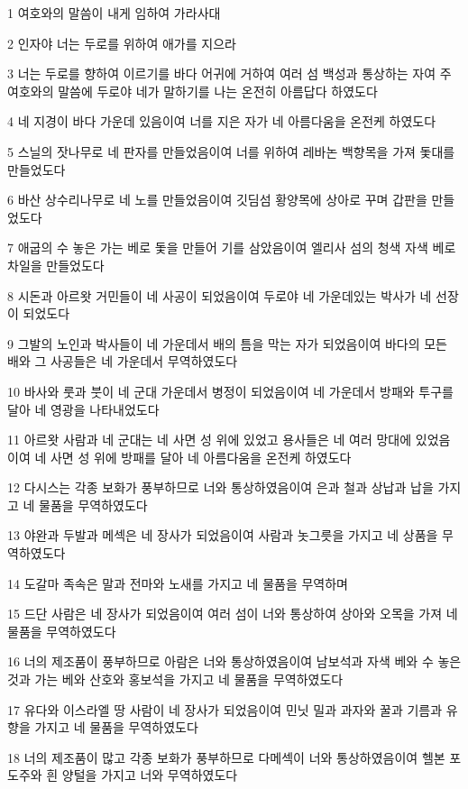 \par 1 여호와의 말씀이 내게 임하여 가라사대
\par 2 인자야 너는 두로를 위하여 애가를 지으라
\par 3 너는 두로를 향하여 이르기를 바다 어귀에 거하여 여러 섬 백성과 통상하는 자여 주 여호와의 말씀에 두로야 네가 말하기를 나는 온전히 아름답다 하였도다
\par 4 네 지경이 바다 가운데 있음이여 너를 지은 자가 네 아름다움을 온전케 하였도다
\par 5 스닐의 잣나무로 네 판자를 만들었음이여 너를 위하여 레바논 백향목을 가져 돛대를 만들었도다
\par 6 바산 상수리나무로 네 노를 만들었음이여 깃딤섬 황양목에 상아로 꾸며 갑판을 만들었도다
\par 7 애굽의 수 놓은 가는 베로 돛을 만들어 기를 삼았음이여 엘리사 섬의 청색 자색 베로 차일을 만들었도다
\par 8 시돈과 아르왓 거민들이 네 사공이 되었음이여 두로야 네 가운데있는 박사가 네 선장이 되었도다
\par 9 그발의 노인과 박사들이 네 가운데서 배의 틈을 막는 자가 되었음이여 바다의 모든 배와 그 사공들은 네 가운데서 무역하였도다
\par 10 바사와 룻과 붓이 네 군대 가운데서 병정이 되었음이여 네 가운데서 방패와 투구를 달아 네 영광을 나타내었도다
\par 11 아르왓 사람과 네 군대는 네 사면 성 위에 있었고 용사들은 네 여러 망대에 있었음이여 네 사면 성 위에 방패를 달아 네 아름다움을 온전케 하였도다
\par 12 다시스는 각종 보화가 풍부하므로 너와 통상하였음이여 은과 철과 상납과 납을 가지고 네 물품을 무역하였도다
\par 13 야완과 두발과 메섹은 네 장사가 되었음이여 사람과 놋그릇을 가지고 네 상품을 무역하였도다
\par 14 도갈마 족속은 말과 전마와 노새를 가지고 네 물품을 무역하며
\par 15 드단 사람은 네 장사가 되었음이여 여러 섬이 너와 통상하여 상아와 오목을 가져 네 물품을 무역하였도다
\par 16 너의 제조품이 풍부하므로 아람은 너와 통상하였음이여 남보석과 자색 베와 수 놓은 것과 가는 베와 산호와 홍보석을 가지고 네 물품을 무역하였도다
\par 17 유다와 이스라엘 땅 사람이 네 장사가 되었음이여 민닛 밀과 과자와 꿀과 기름과 유향을 가지고 네 물품을 무역하였도다
\par 18 너의 제조품이 많고 각종 보화가 풍부하므로 다메섹이 너와 통상하였음이여 헬본 포도주와 흰 양털을 가지고 너와 무역하였도다
